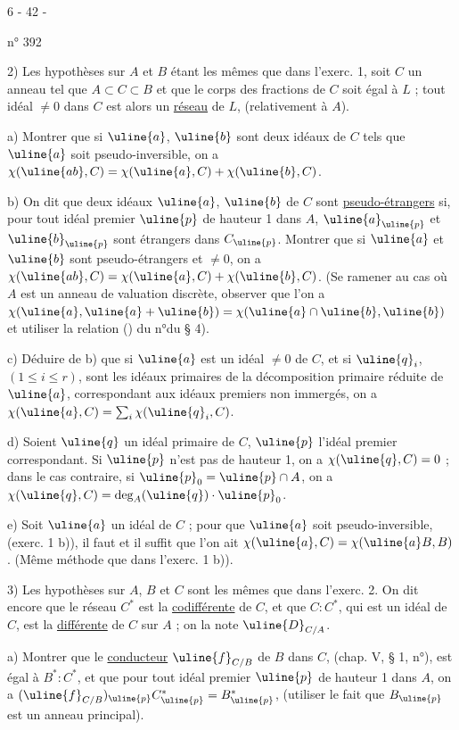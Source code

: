\begin{center}6 - 42 -\end{center}
\hfill n° 392

2) Les hypothèses sur $A$ et $B$ étant les mêmes que dans l'exerc. 1, soit $C$ un anneau tel que $A\subset C\subset B$ et que le corps des fractions de $C$ soit égal à $L$ ; tout idéal $\neq0$ dans $C$ est alors un \uline{réseau} de $L$, (relativement à $A$).

a) Montrer que si $\uline{a}$, $\uline{b}$ sont deux idéaux de $C$ tels que $\uline{a}$ soit pseudo-inversible, on a $\chi(\uline{ab},C)=\chi(\uline{a},C)+\chi(\uline{b},C)$.

b) On dit que deux idéaux $\uline{a}$, $\uline{b}$ de $C$ sont \uline{pseudo-étrangers} si, pour tout idéal premier $\uline{p}$ de hauteur 1 dans $A$, $\uline{a}_{\uline{p}}$ et $\uline{b}_{\uline{p}}$ sont étrangers dans $C_{\uline{p}}$. Montrer que si $\uline{a}$ et $\uline{b}$ sont pseudo-étrangers et $\neq0$, on a $\chi(\uline{ab},C)=\chi(\uline{a},C)+\chi(\uline{b},C)$. (Se ramener au cas où $A$ est un anneau de valuation discrète, observer que l'on a $\chi(\uline{a},\uline{a}+\uline{b})=\chi(\uline{a}\cap\uline{b},\uline{b})$ et utiliser la relation (\quad) du n°\quad du § 4).

c) Déduire de b) que si $\uline{a}$ est un idéal $\neq0$ de $C$, et si $\uline{q}_i$, $(1\leq i\leq r)$, sont les idéaux primaires de la décomposition primaire réduite de $\uline{a}$, correspondant aux idéaux premiers non immergés, on a $\chi(\uline{a},C)=\sum_i\chi(\uline{q}_i,C)$.

d) Soient $\uline{q}$ un idéal primaire de $C$, $\uline{p}$ l'idéal premier correspondant. Si $\uline{p}$ n'est pas de hauteur 1, on a $\chi(\uline{q},C)=0$ ; dans le cas contraire, si $\uline{p}_0=\uline{p}\cap A$, on a $\chi(\uline{q},C)=\deg_A(\uline{q})\cdot\uline{p}_0$.

e) Soit $\uline{a}$ un idéal de $C$ ; pour que $\uline{a}$ soit pseudo-inversible, (exerc. 1 b)), il faut et il suffit que l'on ait $\chi(\uline{a},C)=\chi(\uline{a}B,B)$. (Même méthode que dans l'exerc. 1 b)).

3) Les hypothèses sur $A$, $B$ et $C$ sont les mêmes que dans l'exerc. 2. On dit encore que le réseau $C^*$ est la \uline{codifférente} de $C$, et que $C:C^*$, qui est un idéal de $C$, est la \uline{différente} de $C$ sur $A$ ; on la note $\uline{D}_{C/A}$.

a) Montrer que le \uline{conducteur} $\uline{f}_{C/B}$ de $B$ dans $C$, (chap. V, § 1, n°\quad), est égal à $B^*:C^*$, et que pour tout idéal premier $\uline{p}$ de hauteur 1 dans $A$, on a $(\uline{f}_{C/B})_{\uline{p}}C^*_{\uline{p}}=B^*_{\uline{p}}$, (utiliser le fait que $B_{\uline{p}}$ est un anneau principal).

